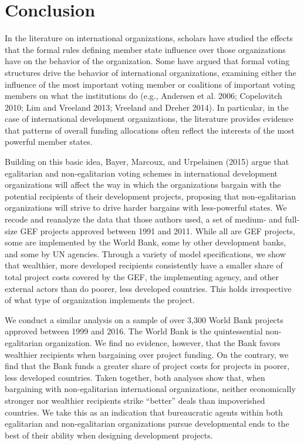 \documentclass{article}
\begin{document}
\section{Conclusion}
In the literature on international organizations, scholars have studied the effects that the formal rules defining member state influence over those organizations have on the behavior of the organization.  Some have argued that formal voting structures drive the behavior of international organizations, examining either the influence of the most important voting member or coalitions of important voting members on what the institutions do (e.g., Andersen et al. 2006; Copelovitch 2010; Lim and Vreeland 2013; Vreeland and Dreher 2014).  In particular, in the case of international development organizations, the literature provides evidence that patterns of overall funding allocations often reflect the interests of the most powerful member states. 

Building on this basic idea, Bayer, Marcoux, and Urpelainen (2015) argue that egalitarian and non-egalitarian voting schemes in international development organizations will affect the way in which the organizations bargain with the potential recipients of their development projects, proposing that non-egalitarian organizations will strive to drive harder bargains with less-powerful states.  We recode and reanalyze the data that those authors used, a set of medium- and full-size GEF projects approved between 1991 and 2011.  While all are GEF projects, some are implemented by the World Bank, some by other development banks, and some by UN agencies.  Through a variety of model specifications, we show that wealthier, more developed recipients consistently have a smaller share of total project costs covered by the GEF, the implementing agency, and other external actors than do poorer, less developed countries.  This holds irrespective of what type of organization implements the project.  

We conduct a similar analysis on a sample of over 3,300 World Bank projects approved between 1999 and 2016.  The World Bank is the quintessential non-egalitarian organization.  We find no evidence, however, that the Bank favors wealthier recipients when bargaining over project funding.  On the contrary, we find that the Bank funds a greater share of project costs for projects in poorer, less developed countries. Taken together, both analyses show that, when bargaining with non-egalitarian international organizations, neither economically stronger nor wealthier recipients strike “better” deals than impoverished countries.  We take this as an indication that bureaucratic agents within both egalitarian and non-egalitarian organizations pursue developmental ends to the best of their ability when designing development projects.
\end{document}
